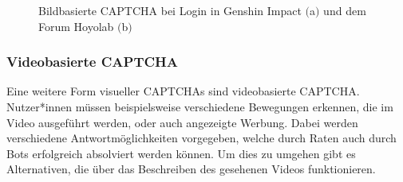 \begin{figure}
    \centering
    \qquad
    \caption{Bildbasierte CAPTCHA bei Login in Genshin Impact $($a$)$ und dem Forum Hoyolab $($b$)$}   
    \label{fig:genshin}
\end{figure}

\subsubsection*{Videobasierte CAPTCHA}
Eine weitere Form visueller CAPTCHAs sind videobasierte CAPTCHA. 
Nutzer*innen müssen beispielsweise verschiedene Bewegungen erkennen, die im Video ausgeführt werden,
oder auch angezeigte Werbung.
Dabei werden verschiedene Antwortmöglichkeiten vorgegeben, welche durch Raten auch durch Bots erfolgreich absolviert werden können.
Um dies zu umgehen gibt es Alternativen, die über das Beschreiben des gesehenen Videos funktionieren. \cite[p.xx]{surveyofresearch} 

